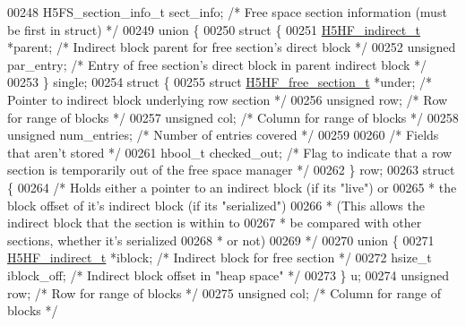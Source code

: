 \begin{DoxyCode}
00248     H5FS\_section\_info\_t sect\_info;              \textcolor{comment}{/* Free space section information (must be first in struct)
       */}
00249     \textcolor{keyword}{union }\{
00250         \textcolor{keyword}{struct }\{
00251             \hyperlink{struct_h5_h_f__indirect__t}{H5HF\_indirect\_t} *parent;            \textcolor{comment}{/* Indirect block parent for free section's
       direct block */}
00252             \textcolor{keywordtype}{unsigned} par\_entry;                 \textcolor{comment}{/* Entry of free section's direct block in parent indirect
       block */}
00253         \} single;
00254         \textcolor{keyword}{struct }\{
00255             \textcolor{keyword}{struct }\hyperlink{struct_h5_h_f__free__section__t}{H5HF\_free\_section\_t} *under;  \textcolor{comment}{/* Pointer to indirect block underlying
       row section */}
00256             \textcolor{keywordtype}{unsigned}    row;                    \textcolor{comment}{/* Row for range of blocks */}
00257             \textcolor{keywordtype}{unsigned}    col;                    \textcolor{comment}{/* Column for range of blocks */}
00258             \textcolor{keywordtype}{unsigned}    num\_entries;            \textcolor{comment}{/* Number of entries covered */}
00259 
00260             \textcolor{comment}{/* Fields that aren't stored */}
00261             hbool\_t     checked\_out;            \textcolor{comment}{/* Flag to indicate that a row section is temporarily out
       of the free space manager */}
00262         \} row;
00263         \textcolor{keyword}{struct }\{
00264             \textcolor{comment}{/* Holds either a pointer to an indirect block (if its "live") or}
00265 \textcolor{comment}{             *  the block offset of it's indirect block (if its "serialized")}
00266 \textcolor{comment}{             *  (This allows the indirect block that the section is within to}
00267 \textcolor{comment}{             *          be compared with other sections, whether it's serialized}
00268 \textcolor{comment}{             *          or not)}
00269 \textcolor{comment}{             */}
00270             \textcolor{keyword}{union }\{
00271                 \hyperlink{struct_h5_h_f__indirect__t}{H5HF\_indirect\_t} *iblock;        \textcolor{comment}{/* Indirect block for free section */}
00272                 hsize\_t iblock\_off;             \textcolor{comment}{/* Indirect block offset in "heap space" */}
00273             \} u;
00274             \textcolor{keywordtype}{unsigned}    row;                    \textcolor{comment}{/* Row for range of blocks */}
00275             \textcolor{keywordtype}{unsigned}    col;                    \textcolor{comment}{/* Column for range of blocks */}

\end{DoxyCode}

